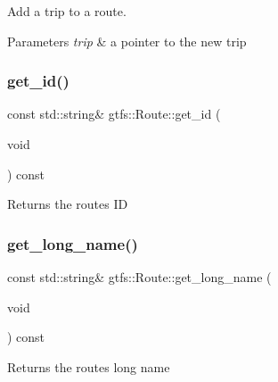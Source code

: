 Add a trip to a route. 
\begin{DoxyParams}{Parameters}
{\em trip} & a pointer to the new trip \\
\hline
\end{DoxyParams}
\mbox{\label{classgtfs_1_1Route_a2d1ee4193b52ab7b8c7eb3160850cf71}} 
\subsubsection{\texorpdfstring{get\+\_\+id()}{get\_id()}}
{\footnotesize\ttfamily const std\+::string\& gtfs\+::\+Route\+::get\+\_\+id (\begin{DoxyParamCaption}\item[{void}]{ }\end{DoxyParamCaption}) const\hspace{0.3cm}{\ttfamily [inline]}}

\begin{DoxyReturn}{Returns}
the route\textquotesingle{}s ID 
\end{DoxyReturn}
\mbox{\label{classgtfs_1_1Route_aa943d312f934a91c3a56aec19d51cc90}} 
\subsubsection{\texorpdfstring{get\+\_\+long\+\_\+name()}{get\_long\_name()}}
{\footnotesize\ttfamily const std\+::string\& gtfs\+::\+Route\+::get\+\_\+long\+\_\+name (\begin{DoxyParamCaption}\item[{void}]{ }\end{DoxyParamCaption}) const\hspace{0.3cm}{\ttfamily [inline]}}

\begin{DoxyReturn}{Returns}
the route\textquotesingle{}s long name 
\end{DoxyReturn}
\mbox{\label{classgtfs_1_1Route_a4d3d7b29be342ae806041801327762a8}} 
